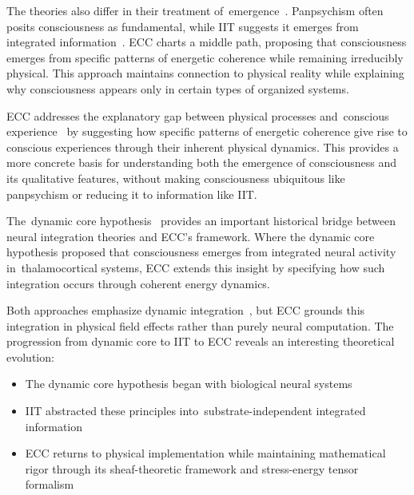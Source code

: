 The theories also differ in their treatment of~emergence~\cite{Goff2019, Shani2015}. Panpsychism often posits consciousness as fundamental, while IIT suggests it emerges from integrated information~\cite{Oizumi2014, Tononi2021}. ECC charts a middle path, proposing that consciousness emerges from specific patterns of energetic coherence while remaining irreducibly physical. This approach maintains connection to physical reality while explaining why consciousness appears only in certain types of organized systems.

ECC addresses the explanatory gap between physical processes and~conscious experience~\cite{Koch2019, Chalmers2018} by suggesting how specific patterns of energetic coherence give rise to conscious experiences through their inherent physical dynamics. This provides a more concrete basis for understanding both the emergence of consciousness and its qualitative features, without making consciousness ubiquitous like panpsychism or reducing it to information like IIT.

The~dynamic core hypothesis~\cite{Baars2013, Mashour2020} provides an important historical bridge between neural integration theories and ECC's framework. Where the dynamic core hypothesis proposed that consciousness emerges from integrated neural activity in~thalamocortical systems, ECC extends this insight by specifying how such integration occurs through coherent energy dynamics. 

Both approaches emphasize dynamic integration~\cite{Tononi2008, Dehaene2011}, but ECC grounds this integration in physical field effects rather than purely neural computation. The progression from dynamic core to IIT to ECC reveals an interesting theoretical evolution:
\begin{itemize}
    \item The dynamic core hypothesis began with biological neural systems
    \item IIT abstracted these principles into~substrate-independent integrated information~\cite{Tononi2015, Tononi2021}
    \item ECC returns to physical implementation while maintaining mathematical rigor through its sheaf-theoretic framework and stress-energy tensor formalism
\end{itemize}

